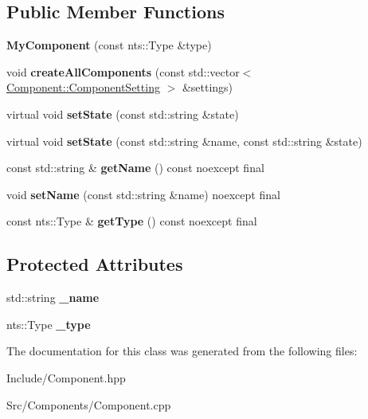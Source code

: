 \subsection*{Public Member Functions}
\begin{DoxyCompactItemize}
\item 
\mbox{\label{classComponent_1_1MyComponent_a354699ef15d0a9dc1a8b85baf9e6179d}} 
{\bfseries My\+Component} (const nts\+::\+Type \&type)
\item 
\mbox{\label{classComponent_1_1MyComponent_ad484b4bed8eed2723095311bdf431a83}} 
void {\bfseries create\+All\+Components} (const std\+::vector$<$ \mbox{\hyperlink{structComponent_1_1ComponentSetting}{Component\+::\+Component\+Setting}} $>$ \&settings)
\item 
\mbox{\label{classComponent_1_1MyComponent_a1783b36ed6c0f02c232ad10d4ab0dc0d}} 
virtual void {\bfseries set\+State} (const std\+::string \&state)
\item 
\mbox{\label{classComponent_1_1MyComponent_aa76da44b713bd627e239de4fff41c526}} 
virtual void {\bfseries set\+State} (const std\+::string \&name, const std\+::string \&state)
\item 
\mbox{\label{classComponent_1_1MyComponent_a632744b7989cfad5eab18a8b41cb9d3a}} 
const std\+::string \& {\bfseries get\+Name} () const noexcept final
\item 
\mbox{\label{classComponent_1_1MyComponent_a517586ccab356be9b4398fba050dcf38}} 
void {\bfseries set\+Name} (const std\+::string \&name) noexcept final
\item 
\mbox{\label{classComponent_1_1MyComponent_a9848edcd43b45bf4b00a54858b5d3f01}} 
const nts\+::\+Type \& {\bfseries get\+Type} () const noexcept final
\end{DoxyCompactItemize}
\subsection*{Protected Attributes}
\begin{DoxyCompactItemize}
\item 
\mbox{\label{classComponent_1_1MyComponent_ad8bdf4875c9b38b8f993d0d8b2b061ed}} 
std\+::string {\bfseries \+\_\+name}
\item 
\mbox{\label{classComponent_1_1MyComponent_a97b7442dac976e6f1d64e95636e5a2b4}} 
nts\+::\+Type {\bfseries \+\_\+type}
\end{DoxyCompactItemize}


The documentation for this class was generated from the following files\+:\begin{DoxyCompactItemize}
\item 
Include/Component.\+hpp\item 
Src/\+Components/Component.\+cpp\end{DoxyCompactItemize}
